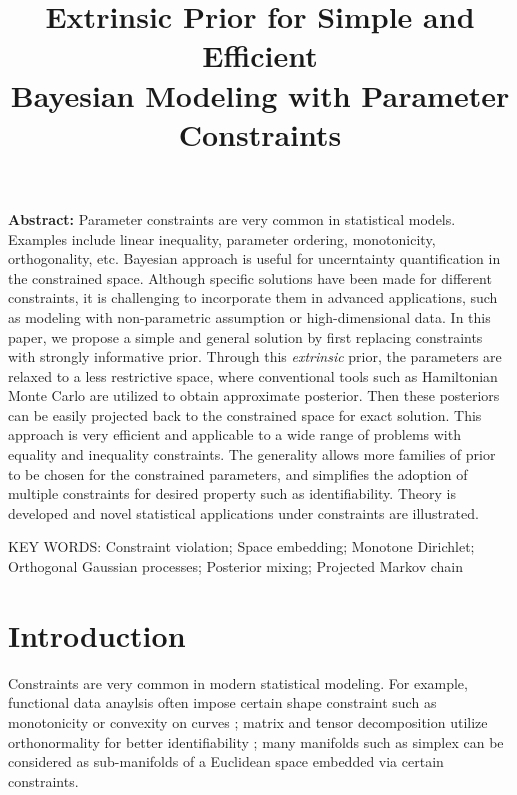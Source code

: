\documentclass[10pt]{article}
\title{\textbf{Extrinsic Prior for Simple and Efficient\\ Bayesian Modeling with Parameter Constraints}}
\date{}
\begin{document}
\maketitle


{\bf Abstract:} Parameter constraints are very common in statistical models. Examples include linear inequality, parameter ordering, monotonicity, orthogonality, etc. Bayesian approach is useful for uncerntainty quantification in the constrained space. Although specific solutions have been made for different constraints, it is challenging to incorporate them in advanced applications, such as modeling with non-parametric assumption or high-dimensional data. In this paper, we propose a simple and general solution by first replacing constraints with strongly informative prior. Through this {\it extrinsic} prior, the parameters are relaxed to a less restrictive space, where conventional tools such as Hamiltonian Monte Carlo are utilized to obtain approximate posterior. Then these posteriors can be easily projected back to the constrained space for exact solution. This approach is very efficient and applicable to a wide range of problems with equality and inequality constraints. The generality allows more families of prior to be chosen for the constrained parameters, and simplifies the adoption of multiple constraints for desired property such as identifiability. Theory is developed and novel statistical applications under constraints are illustrated.
\vskip 12pt

{\noindent  KEY WORDS:  Constraint violation; Space embedding; Monotone Dirichlet; Orthogonal Gaussian processes; Posterior mixing; Projected Markov chain}
{}

\section{Introduction}

Constraints are very common in modern statistical modeling. For example, functional data anaylsis often impose certain shape constraint such as monotonicity or convexity on curves \citep{kelly1990monotone}; matrix and tensor decomposition utilize orthonormality for better identifiability \citep{uschmajew2010well}; many manifolds such as simplex can be considered as sub-manifolds of a Euclidean space embedded via certain constraints.
\end{document}
